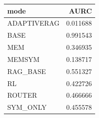 \begin{tabular}{lr}
\toprule
mode & AURC \\
\midrule
ADAPTIVERAG & 0.011688 \\
BASE & 0.991543 \\
MEM & 0.346935 \\
MEMSYM & 0.138717 \\
RAG_BASE & 0.551327 \\
RL & 0.422726 \\
ROUTER & 0.466666 \\
SYM_ONLY & 0.455578 \\
\bottomrule
\end{tabular}
